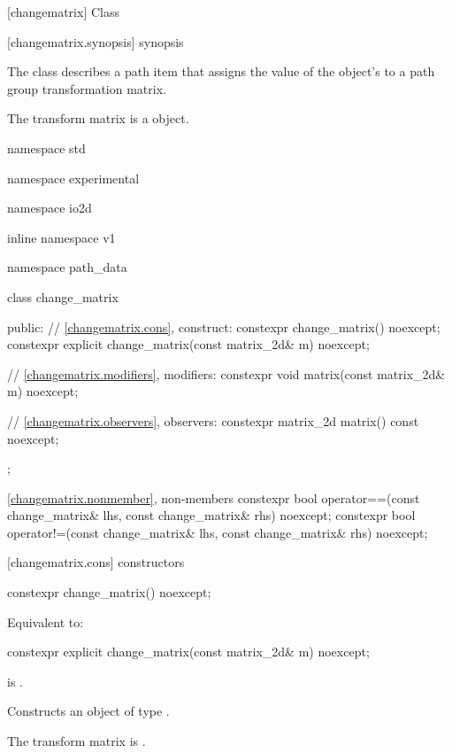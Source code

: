  [changematrix] {Class }%

 [changematrix.synopsis] { synopsis}%

\pnum
{}
The class  describes a path item that assigns the value of the  object's  to a path group transformation matrix.

\pnum
The transform matrix is a  object.

\begin{codeblock}
namespace std { namespace experimental { namespace io2d { inline namespace v1 {
  namespace path_data {
    class change_matrix {
    public:
      // \ref{changematrix.cons}, construct:
      constexpr change_matrix() noexcept;
      constexpr explicit change_matrix(const matrix_2d& m) noexcept;

      // \ref{changematrix.modifiers}, modifiers:
      constexpr void matrix(const matrix_2d& m) noexcept;

      // \ref{changematrix.observers}, observers:
      constexpr matrix_2d matrix() const noexcept;
    };
    
    \ref{changematrix.nonmember}, non-members
    constexpr bool operator==(const change_matrix& lhs,
      const change_matrix& rhs) noexcept;
    constexpr bool operator!=(const change_matrix& lhs,
      const change_matrix& rhs) noexcept;
  }
} } } }
\end{codeblock}

 [changematrix.cons] { constructors}%

%
\begin{itemdecl}
constexpr change_matrix() noexcept;
\end{itemdecl}
\begin{itemdescr}
\pnum
\effects
Equivalent to: 
\end{itemdescr}

%
\begin{itemdecl}
constexpr explicit change_matrix(const matrix_2d& m) noexcept;
\end{itemdecl}
\begin{itemdescr}
\pnum
\requires
{} is .

\pnum
\effects
Constructs an object of type .

\pnum
The transform matrix is .
\end{itemdescr}

